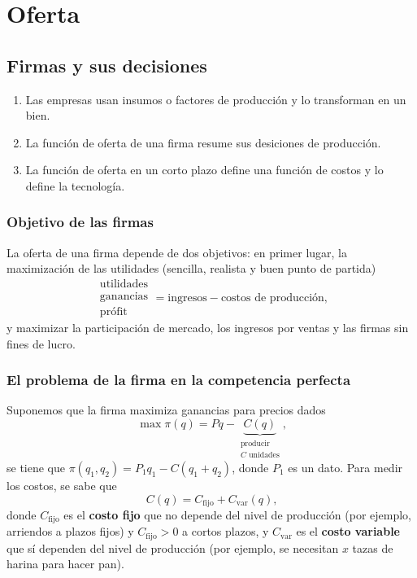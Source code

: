 \documentclass{report}
\begin{document}


\chapter{Oferta}

\section{Firmas y sus decisiones}

\begin{enumerate}
\item Las empresas usan insumos o factores de producción y lo transforman en un bien.
\item La función de oferta de una firma resume sus desiciones de producción.
\item La función de oferta en un corto plazo define una función de costos y lo define la tecnología.
\end{enumerate}

\subsection{Objetivo de las firmas}

La oferta de una firma depende de dos objetivos: en primer lugar, la maximización de las utilidades (sencilla, realista y buen punto de partida)
\[
\begin{matrix}
\text{utilidades} \\
\text{ganancias} \\
\text{prófit}
\end{matrix}
=\text{ingresos}-\text{costos de producción,}
\]
y maximizar la participación de mercado, los ingresos por ventas y las firmas sin fines de lucro.

\subsection{El problema de la firma en la competencia perfecta}

Suponemos que la firma maximiza ganancias para precios dados
\[
\max\pi\!\left(q\right)=Pq-\underbrace{C\!\left(q\right)}_{\begin{smallmatrix}\text{producir}\\C\text{ unidades}\end{smallmatrix}}\text{,}
\]
se tiene que $\pi\!\left(q_1,q_2\right)=P_1q_1-C\!\left(q_1+q_2\right)$, donde $P_1$ es un dato. Para medir los costos, se sabe que
\[
C\!\left(q\right)=C_\text{fijo}+C_\text{var}\!\left(q\right)\text{,}
\]
donde $C_\text{fijo}$ es el \textbf{costo fijo} que no depende del nivel de producción (por ejemplo, arriendos a plazos fijos) y $C_\text{fijo}>0$ a cortos plazos, y $C_\text{var}$ es el \textbf{costo variable} que sí dependen del nivel de producción (por ejemplo, se necesitan $x$ tazas de harina para hacer pan).
\end{document}
